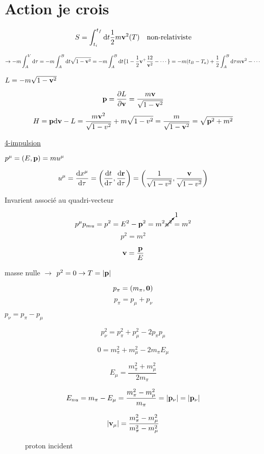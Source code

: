 


\section*{Action je crois}



$$ S = \int_{t_{i}}^{t_{f}} \dd t \frac{1}{2} m \vb{v}^2 (T) \quad \text{non-relativiste} $$ 



$$\to -m \int_{A}^{V}\dd \tau = -m \int_{A}^{B}\dd t \sqrt{1 - \vb{v}^2} = -m \int_{A}^{B}\dd t \{ 1 - \frac{1}{2} \vb{v}^ + \frac{12}{\vb{v}^2} - \dotsb \}  = -m(t_B -T_a ) + \frac{1}{2} \int_{A}^{B}\dd \tau m \vb{v}^2 - \dotsb$$ 


$L=-m \sqrt{1-\vb{v}^2}$ 

$$\vb{p}= \pdv{L}{\vb{v}} = \frac{m\vb{v}}{\sqrt{1-\vb{v}^2} } $$ 
$$H = \vb{p} \dd \vb{v} - L = \frac{m\vb{v}^2}{\sqrt{1-v^2}}+ m\sqrt{1-v^2}= \frac{m}{\sqrt{1-\vb{v}^2}  } = \sqrt{\vb{p}^2 + m^2} $$ 


\underline{4-impulsion} 

$p^{\mu}= \left( E, \vb{p} \right) = m u^\mu $ 

$$u^{\mu}= \dv{x^{\mu}}{\tau} = \left( \dv{t}{\tau} , \dv{\vb{r}}{\tau}  \right)  = \left( \frac{1}{\sqrt{1-v^2}} , \frac{\vb{v}}{\sqrt{1-v^2}}  \right) $$ 


Invarient associé au quadri-vecteur

$$p^{\mu}p_{mu} = p^{2}= E^{2}- \vb{p}^2 = m^{2} \cancelto{1}{u^2} = m^2$$ 
$$p^{2}=m^2$$ 

$$\vb{v} = \frac{\vb{p}}{E}$$ 

masse nulle $\to$ $p^{2}=0 \to T = \abs{\vb{p}} $  


$$p_{\pi} = (m_{\pi} , \vb{0})$$ 
$$p_{\pi} = p_{\mu} + p_\nu$$ 

$p_{\nu} = p_{\pi} - p_{\mu} $ 

$$p_{\nu}^{2}= p_{\pi}^2+p_{\mu}^{2} - 2 p_{\pi} p_{\mu} $$ 

$$0 = m_{\pi}^{2}+m_{\mu}^{2}-2m_{\pi} E_\mu$$ 

$$E_{\mu} = \frac{m_{\pi}^2+m_{\mu}^2}{2 m_\pi} $$ 

$$E_{nu} = m_{\pi}- E_{\mu} = \frac{m_{\pi}^{2}- m_{\mu}^2}{m_{\pi}} = \abs{\vb{p}_\nu} = \abs{\vb{p}_\nu }   $$ 

$$\abs{\vb{v}_\mu}  = \frac{m_{\pi}^{2} - m_{\mu}^2}{m_{\pi}^{2}- m_{\mu}^2} $$ 


\begin{figure}[ht]
    \centering
    \caption{proton incident}
    \label{fig:photon-incident}
\end{figure}

